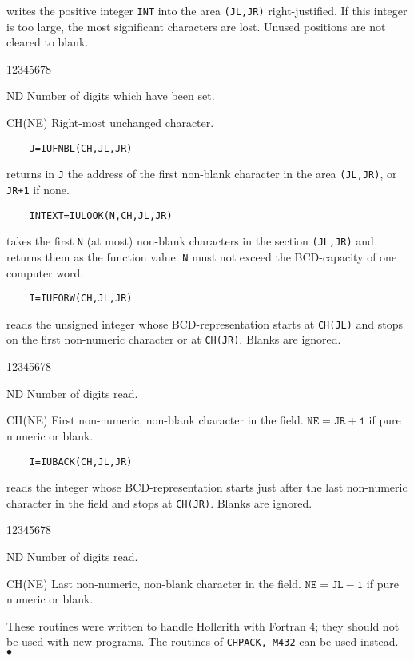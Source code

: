 writes the positive integer {\tt INT} into the area {\tt (JL,JR)}
right-justified. If this integer is too large, the most significant
characters are lost. Unused positions are not cleared to blank.
\begin{DLtt}{12345678}
\item [ND] Number of digits which have been set.
\item [CH(NE)] Right-most unchanged character.
\end{DLtt}
\begin{verbatim}
    J=IUFNBL(CH,JL,JR)
\end{verbatim}
returns in {\tt J} the address of the first non-blank character in
the area {\tt (JL,JR)}, or {\tt JR+1} if none.
\begin{verbatim}
    INTEXT=IULOOK(N,CH,JL,JR)
\end{verbatim}
takes the first {\tt N} (at most) non-blank characters in the section
{\tt (JL,JR)} and returns them as the function value. {\tt N} must not
exceed the BCD-capacity of one computer word.
\newpage
\begin{verbatim}
    I=IUFORW(CH,JL,JR)
\end{verbatim}
reads the unsigned integer whose BCD-representation starts at
{\tt CH(JL)} and stops on the first non-numeric character or at
{\tt CH(JR)}. Blanks are ignored.
\begin{DLtt}{12345678}
\item [ND] Number of digits read.
\item [CH(NE)] First non-numeric, non-blank character in the field.
$\mathtt{NE=JR+1}$ if pure numeric or blank.
\end{DLtt}
\begin{verbatim}
    I=IUBACK(CH,JL,JR)
\end{verbatim}
reads the integer whose BCD-representation starts just after the last
non-numeric character in the field and stops at {\tt CH(JR)}.
Blanks are ignored.
\begin{DLtt}{12345678}
\item [ND] Number of digits read.
\item [CH(NE)] Last non-numeric, non-blank character in the field.
$\mathtt{NE=JL-1}$ if pure numeric or blank.
\end{DLtt}
\Notes
These routines were written to handle Hollerith with Fortran 4;
they should not be used with new programs.
The routines of {\tt CHPACK, M432} can be used instead.
\\ $\bullet$
